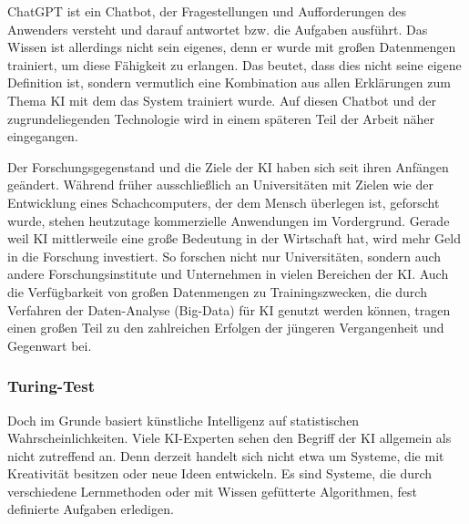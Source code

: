 \documentclass[a4paper,12pt, german]{report}
\begin{document}
ChatGPT ist ein Chatbot, der Fragestellungen und Aufforderungen des Anwenders versteht und darauf antwortet bzw. die Aufgaben ausführt. Das Wissen ist allerdings nicht sein eigenes, denn er wurde mit großen Datenmengen trainiert, um diese Fähigkeit zu erlangen. Das beutet, dass dies nicht seine eigene Definition ist, sondern vermutlich eine Kombination aus allen Erklärungen zum Thema KI mit dem das System trainiert wurde. Auf diesen Chatbot und der zugrundeliegenden Technologie wird in einem späteren Teil der Arbeit näher eingegangen.

Der Forschungsgegenstand und die Ziele der KI haben sich seit ihren Anfängen geändert. Während früher ausschließlich an Universitäten mit Zielen wie der Entwicklung eines Schachcomputers, der dem Mensch überlegen ist, geforscht wurde, stehen heutzutage kommerzielle Anwendungen im Vordergrund. 
Gerade weil KI mittlerweile eine große Bedeutung in der Wirtschaft hat, wird mehr Geld in die Forschung investiert. So forschen nicht nur Universitäten, sondern auch andere Forschungsinstitute und Unternehmen in vielen Bereichen der KI. Auch die Verfügbarkeit von großen Datenmengen zu Trainingszwecken, die durch Verfahren der Daten-Analyse (Big-Data) für KI genutzt werden können, tragen einen großen Teil zu den zahlreichen Erfolgen der jüngeren Vergangenheit und Gegenwart bei. \cite{10}

\subsubsection{Turing-Test}

Doch im Grunde basiert künstliche Intelligenz auf statistischen Wahrscheinlichkeiten. Viele KI-Experten sehen den Begriff der KI allgemein als nicht zutreffend an. Denn derzeit handelt sich nicht etwa um Systeme, die mit Kreativität besitzen oder neue Ideen entwickeln. Es sind Systeme, die durch verschiedene Lernmethoden oder mit Wissen gefütterte Algorithmen, fest definierte Aufgaben erledigen. 
\end{document}
